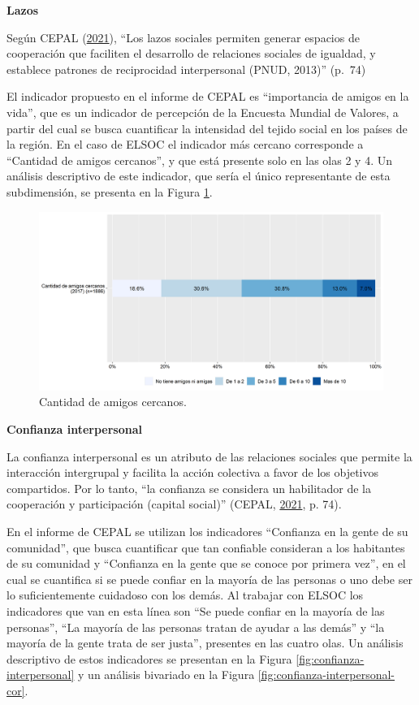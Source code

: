 \documentclass[
  12pt,
]{book}
\begin{document}
\textbf{Lazos}

Según CEPAL (\protect\hyperlink{ref-cepal_Cohesion_2021}{2021}), ``Los lazos sociales permiten generar espacios de cooperación que faciliten el desarrollo de relaciones sociales de igualdad, y establece patrones de reciprocidad interpersonal (PNUD, 2013)'' (p.~74)

El indicador propuesto en el informe de CEPAL es ``importancia de amigos en la vida'', que es un indicador de percepción de la Encuesta Mundial de Valores, a partir del cual se busca cuantificar la intensidad del tejido social en los países de la región. En el caso de ELSOC el indicador más cercano corresponde a ``Cantidad de amigos cercanos'', y que está presente solo en las olas 2 y 4. Un análisis descriptivo de este indicador, que sería el único representante de esta subdimensión, se presenta en la Figura \ref{fig:lazos}.

\begin{figure}[H]

{\centering \includegraphics[width=1\linewidth,height=1\textheight]{output/graphs/lazos} 

}

\caption{Cantidad de amigos cercanos.}\label{fig:lazos}
\end{figure}

\textbf{Confianza interpersonal}

La confianza interpersonal es un atributo de las relaciones sociales que permite la interacción intergrupal y facilita la acción colectiva a favor de los objetivos compartidos. Por lo tanto, ``la confianza se considera un habilitador de la cooperación y participación (capital social)'' (CEPAL, \protect\hyperlink{ref-cepal_Cohesion_2021}{2021}, p. 74).

En el informe de CEPAL se utilizan los indicadores ``Confianza en la gente de su comunidad'', que busca cuantificar que tan confiable consideran a los habitantes de su comunidad y ``Confianza en la gente que se conoce por primera vez'', en el cual se cuantifica si se puede confiar en la mayoría de las personas o uno debe ser lo suficientemente cuidadoso con los demás. Al trabajar con ELSOC los indicadores que van en esta línea son ``Se puede confiar en la mayoría de las personas'', ``La mayoría de las personas tratan de ayudar a las demás'' y ``la mayoría de la gente trata de ser justa'', presentes en las cuatro olas. Un análisis descriptivo de estos indicadores se presentan en la Figura \ref{fig:confianza-interpersonal} y un análisis bivariado en la Figura \ref{fig:confianza-interpersonal-cor}.
\end{document}
